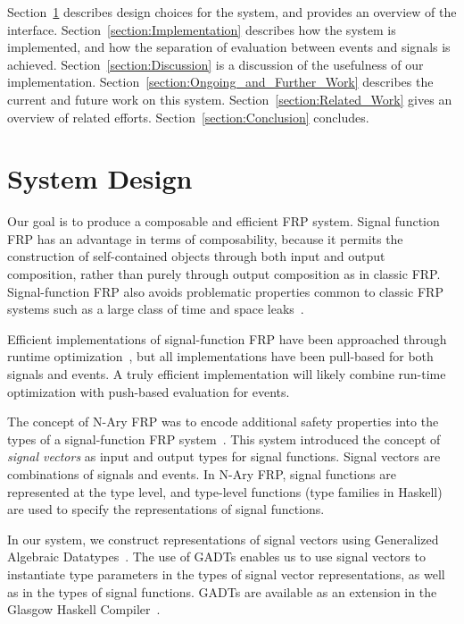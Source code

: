 \documentclass[draft]{llncs}
\begin{document}
Section~\ref{section:System_Design} describes design choices for the system,
and provides an overview of the interface. Section~\ref{section:Implementation}
describes how the system is implemented, and how the separation of evaluation
between events and signals is achieved. Section~\ref{section:Discussion} is a
discussion of the usefulness of our implementation. 
Section~\ref{section:Ongoing_and_Further_Work} describes the current and future
work on this system. Section~\ref{section:Related_Work} gives an overview of
related efforts. Section~\ref{section:Conclusion} concludes.

\section{System Design}
\label{section:System_Design}

Our goal is to produce a composable and efficient FRP system. Signal function
FRP has an advantage in terms of composability, because it permits the
construction of self-contained objects through both input and output composition,
rather than purely through output composition as in classic FRP. Signal-function
FRP also avoids problematic properties common to classic FRP systems such as a
large class of time and space leaks~\cite{Liu2007}.

Efficient implementations of signal-function FRP have been approached through
runtime optimization~\cite{Nilsson2005}, but all implementations have been
pull-based for both signals and events. A truly efficient implementation will
likely combine run-time optimization with push-based evaluation for events.

The concept of N-Ary FRP was to encode additional safety properties into the
types of a signal-function FRP system~\cite{Sculthorpe2011}. This system
introduced the concept of {\em signal vectors} as input and output types for
signal functions. Signal vectors are combinations of signals and events. In
N-Ary FRP, signal functions are represented at the type level, and type-level
functions (type families in Haskell) are used to specify the representations
of signal functions.

In our system, we construct representations of signal vectors using
Generalized Algebraic Datatypes~\cite{Cheney2003,Xi2003}. The use of GADTs
enables us to use signal vectors to instantiate type parameters in the types
of signal vector representations, as well as in the types of signal functions.
GADTs are available as an extension in the Glasgow Haskell Compiler~\cite{PeytonJones2006}.
\end{document}
